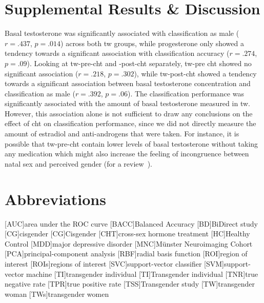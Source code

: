 \documentclass{article}
\begin{document}
    \section{Supplemental Results \& Discussion}
    Basal testosterone was significantly associated with classification as male ($r = .437$, $p = .014$) across both \ac{tw} groups, while progesterone only showed a tendency towards a significant association with classification accuracy ($r = .274$, $p = .09$). Looking at \ac{tw}-pre-\ac{cht} and -post-\ac{cht} separately, \ac{tw}-pre \ac{cht} showed no significant association ($r = .218$, $p = .302$), while \ac{tw}-post-\ac{cht} showed a tendency towards a significant association between basal testosterone concentration and classification as male ($r = .392$, $p =.06$).
    The classification performance was significantly associated with the amount of basal testosterone measured in \ac{tw}. However, this association alone is not sufficient to draw any conclusions on the effect of \ac{cht} on classification performance, since we did not directly measure the amount of estradiol and anti-androgens that were taken. For instance, it is possible that \ac{tw}-pre-\ac{cht} contain lower levels of basal testosterone without taking any medication which might also increase the feeling of incongruence between natal sex and perceived gender (for a review~\cite{Nguyen2018a}).


    \section{Abbreviations}
    \begin{acronym}
        [AUC]{area under the ROC curve}
        [BACC]{Balanced Accuracy}
        [BD]{BiDirect study}
        [CG]{cisgender}
        [CG]{Cisgender}
        [CHT]{cross-sex hormone treatment}
        [HC]{Healthy Control}
        [MDD]{major depressive disorder}
        [MNC]{Münster Neuroimaging Cohort}
        [PCA]{principal-component analysis}
        [RBF]{radial basis function}
        [ROI]{region of interest}
        [ROIs]{regions of interest}
        [SVC]{support-vector classifier}
        [SVM]{support-vector machine}
        [TI]{transgender individual}
        [TI]{Transgender individual}
        [TNR]{true negative rate}
        [TPR]{true positive rate}
        [TSS]{Transgender study}
        [TW]{transgender woman}
        [TWs]{transgender women}
    \end{acronym}
\end{document}
